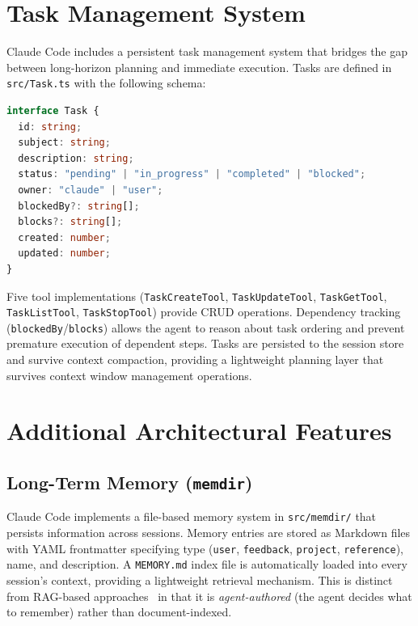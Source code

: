 \documentclass{article}
\begin{document}
\section{Task Management System}

Claude Code includes a persistent task management system that bridges the gap between long-horizon planning and immediate execution. Tasks are defined in \texttt{src/Task.ts} with the following schema:

\begin{lstlisting}[language=TypeScript]
interface Task {
  id: string;
  subject: string;
  description: string;
  status: "pending" | "in_progress" | "completed" | "blocked";
  owner: "claude" | "user";
  blockedBy?: string[];
  blocks?: string[];
  created: number;
  updated: number;
}
\end{lstlisting}

Five tool implementations (\texttt{TaskCreateTool}, \texttt{TaskUpdateTool}, \texttt{TaskGetTool}, \texttt{TaskListTool}, \texttt{TaskStopTool}) provide CRUD operations. Dependency tracking (\texttt{blockedBy}/\texttt{blocks}) allows the agent to reason about task ordering and prevent premature execution of dependent steps. Tasks are persisted to the session store and survive context compaction, providing a lightweight planning layer that survives context window management operations.

\section{Additional Architectural Features}

\subsection{Long-Term Memory (\texttt{memdir})}

Claude Code implements a file-based memory system in \texttt{src/memdir/} that persists information across sessions. Memory entries are stored as Markdown files with YAML frontmatter specifying type (\texttt{user}, \texttt{feedback}, \texttt{project}, \texttt{reference}), name, and description. A \texttt{MEMORY.md} index file is automatically loaded into every session's context, providing a lightweight retrieval mechanism. This is distinct from RAG-based approaches~\cite{lewis2020retrieval} in that it is \emph{agent-authored} (the agent decides what to remember) rather than document-indexed.
\end{document}

